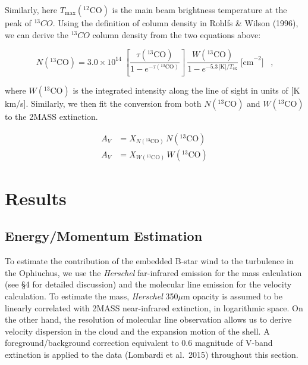 \documentclass[11pt,a4paper]{emulateapj}
\begin{document}
Similarly, here $T_{\text{max}}(^{12}\text{CO})$ is the main beam brightness temperature at the peak of $^{13}CO$. Using the definition of column density in Rohlfs \& Wilson (1996), we can derive the $^{13}CO$ column density from the two equations above:

\begin{equation}
N(^{13}\text{CO}) = 3.0\times10^{14}\;\left[\frac{\tau(^{13}\text{CO})}{1-e^{-\tau(^{13}\text{CO})}}\right]\,\frac{W(^{13}\text{CO})}{1-e^{-5.3\,\text{[K]}/T_{\text{ex}}}}\;\text{[cm}^{-2}\text{]}\;\;\;\text{,}
\end{equation}

where $W(^{13}\text{CO})$ is the integrated intensity along the line of sight in units of [K km/s]. Similarly, we then fit the conversion from both $N(^{13}\text{CO})$ and $W(^{13}\text{CO})$ to the 2MASS extinction.

\begin{equation}
\begin{aligned}
A_V &= X_{N(^{13}\text{CO})}\,N(^{13}\text{CO}) \\
A_V &= X_{W(^{13}\text{CO})}\,W(^{13}\text{CO})
\end{aligned}
\end{equation}


\section{Results}
\label{sec:results}

\subsection{Energy/Momentum Estimation}
To estimate the contribution of the embedded B-star wind to the turbulence in the Ophiuchus, we use the {\it Herschel} far-infrared emission for the mass calculation (see \S4 for detailed discussion) and the molecular line emission for the velocity calculation. To estimate the mass, {\it Herschel} 350$\mu$m opacity is assumed to be linearly correlated with 2MASS near-infrared extinction, in logarithmic space. On the other hand, the resolution of molecular line observation allows us to derive velocity dispersion in the cloud and the expansion motion of the shell. A foreground/background correction equivalent to 0.6 magnitude of V-band extinction is applied to the data (Lombardi et al.\ 2015) throughout this section.
\end{document}
